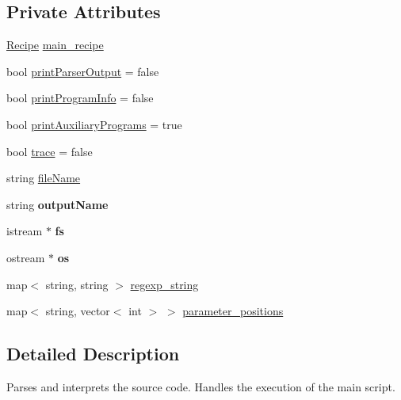 \subsection*{Private Attributes}
\begin{DoxyCompactItemize}
\item 
\hyperlink{classRecipe}{Recipe} \hyperlink{classProgram_a414bb40153c7da0e1815b7140c4aa454}{main\-\_\-recipe}
\item 
bool \hyperlink{classProgram_a3787a8712d4c75b6b5f0e81a5e4f6fdc}{print\-Parser\-Output} = false
\item 
bool \hyperlink{classProgram_a4addd74ec821dc25e804fa2096b7fa59}{print\-Program\-Info} = false
\item 
bool \hyperlink{classProgram_ad4371cad6bc5c0f4cd232007a2324205}{print\-Auxiliary\-Programs} = true
\item 
bool \hyperlink{classProgram_a5f4a3688d83bf77b92e294933671007c}{trace} = false
\item 
string \hyperlink{classProgram_a8b56614562949906e79e18efdd88d554}{file\-Name}
\item 
\hypertarget{classProgram_aadec82f9e56e4e335bd86daa01d08756}{string {\bfseries output\-Name}}\label{classProgram_aadec82f9e56e4e335bd86daa01d08756}

\item 
\hypertarget{classProgram_a908a89405ed5f557624d5893da16a8d7}{istream $\ast$ {\bfseries fs}}\label{classProgram_a908a89405ed5f557624d5893da16a8d7}

\item 
\hypertarget{classProgram_ace98ead8027976274a08c57832a80f88}{ostream $\ast$ {\bfseries os}}\label{classProgram_ace98ead8027976274a08c57832a80f88}

\item 
map$<$ string, string $>$ \hyperlink{classProgram_af2653e6c49451f67e7365c218eaab08a}{regexp\-\_\-string}
\item 
map$<$ string, vector$<$ int $>$ $>$ \hyperlink{classProgram_a941f96a02d5fd027979cbc7b484f04c7}{parameter\-\_\-positions}
\end{DoxyCompactItemize}


\subsection{Detailed Description}
Parses and interprets the source code. Handles the execution of the main script. 

